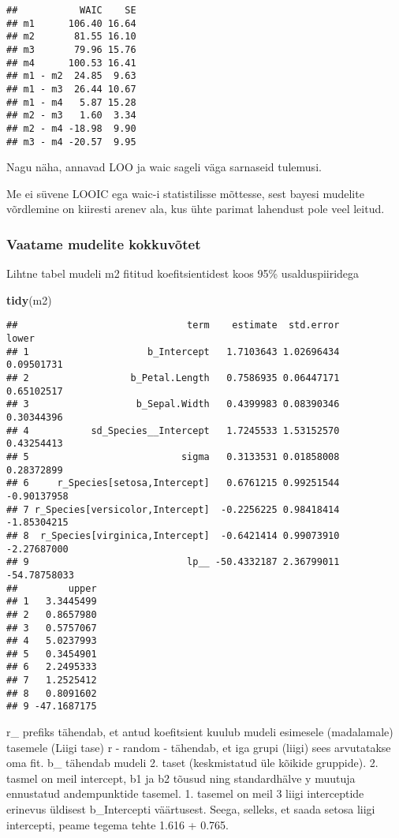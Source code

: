 \documentclass[]{article}
\newenvironment{Shaded}{\begin{snugshade}}{\end{snugshade}}
\newcommand{\KeywordTok}[1]{\textcolor[rgb]{0.13,0.29,0.53}{\textbf{#1}}}
\newcommand{\NormalTok}[1]{#1}
\begin{document}
\begin{verbatim}
##           WAIC    SE
## m1      106.40 16.64
## m2       81.55 16.10
## m3       79.96 15.76
## m4      100.53 16.41
## m1 - m2  24.85  9.63
## m1 - m3  26.44 10.67
## m1 - m4   5.87 15.28
## m2 - m3   1.60  3.34
## m2 - m4 -18.98  9.90
## m3 - m4 -20.57  9.95
\end{verbatim}

Nagu näha, annavad LOO ja waic sageli väga sarnaseid tulemusi.

Me ei süvene LOOIC ega waic-i statistilisse mõttesse, sest bayesi
mudelite võrdlemine on kiiresti arenev ala, kus ühte parimat lahendust
pole veel leitud.

\subsubsection{Vaatame mudelite
kokkuvõtet}\label{vaatame-mudelite-kokkuvotet}

Lihtne tabel mudeli m2 fititud koefitsientidest koos 95\%
usalduspiiridega

\begin{Shaded}
\begin{Highlighting}[]
\KeywordTok{tidy}\NormalTok{(m2)}
\end{Highlighting}
\end{Shaded}

\begin{verbatim}
##                              term    estimate  std.error        lower
## 1                     b_Intercept   1.7103643 1.02696434   0.09501731
## 2                  b_Petal.Length   0.7586935 0.06447171   0.65102517
## 3                   b_Sepal.Width   0.4399983 0.08390346   0.30344396
## 4           sd_Species__Intercept   1.7245533 1.53152570   0.43254413
## 5                           sigma   0.3133531 0.01858008   0.28372899
## 6     r_Species[setosa,Intercept]   0.6761215 0.99251544  -0.90137958
## 7 r_Species[versicolor,Intercept]  -0.2256225 0.98418414  -1.85304215
## 8  r_Species[virginica,Intercept]  -0.6421414 0.99073910  -2.27687000
## 9                            lp__ -50.4332187 2.36799011 -54.78758033
##         upper
## 1   3.3445499
## 2   0.8657980
## 3   0.5757067
## 4   5.0237993
## 5   0.3454901
## 6   2.2495333
## 7   1.2525412
## 8   0.8091602
## 9 -47.1687175
\end{verbatim}

r\_ prefiks tähendab, et antud koefitsient kuulub mudeli esimesele
(madalamale) tasemele (Liigi tase) r - random - tähendab, et iga grupi
(liigi) sees arvutatakse oma fit. b\_ tähendab mudeli 2. taset
(keskmistatud üle kõikide gruppide). 2. tasmel on meil intercept, b1 ja
b2 tõusud ning standardhälve y muutuja ennustatud andempunktide tasemel.
1. tasemel on meil 3 liigi interceptide erinevus üldisest b\_Intercepti
väärtusest. Seega, selleks, et saada setosa liigi intercepti, peame
tegema tehte 1.616 + 0.765.
\end{document}
